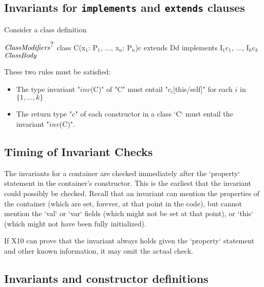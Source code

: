 \subsection{Invariants for {\tt implements} and {\tt extends} clauses}\label{DepType:Implements}
\label{DepType:Extends}
Consider a class definition
\begin{xtenmath}
$\mbox{\emph{ClassModifiers}}^{\mbox{?}}$
class C(x$_1$: P$_1$, $\dots$, x$_n$: P$_n$){c} extends D{d}
   implements I$_1${c$_1$}, $\dots$, I$_k${c$_k$}
$\mbox{\emph{ClassBody}}$
\end{xtenmath}

These two rules must be satisfied:


\begin{itemize}

\item 
The type invariant \xcdmath"$\mathit{inv}$(C)" of \xcd"C" must entail
\xcdmath"c$_i$[this/self]" for each $i$ in $\{1, \dots, k\}$


\item The return type \xcd"c" of each constructor in a class \xcd`C`
must entail the invariant \xcdmath"$\mathit{inv}$(C)".
\end{itemize}

\subsection{Timing of Invariant Checks}


The invariants for a container are checked immediately after the
\xcd`property` statement in the container's constructor. 
This is the earliest that the invariant could possibly be checked. 
Recall that an invariant 
can mention the properties of the container (which are set, forever, at that
point in the code), but cannot mention the \xcd`val`
or \xcd`var` fields (which might not be set at that point), or \xcd`this`
(which might not have been fully initialized).  

If X10 can prove that the invariant always holds given the \xcd`property`
statement and other known information, it may omit the actual check.




\subsection{Invariants and constructor definitions}

